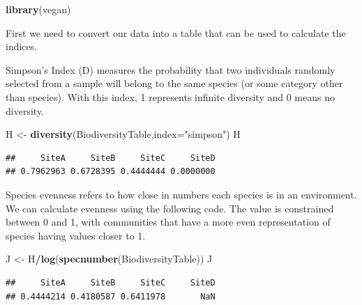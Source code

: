 \documentclass[]{book}
\newenvironment{Shaded}{\begin{snugshade}}{\end{snugshade}}
\newcommand{\DataTypeTok}[1]{\textcolor[rgb]{0.13,0.29,0.53}{#1}}
\newcommand{\KeywordTok}[1]{\textcolor[rgb]{0.13,0.29,0.53}{\textbf{#1}}}
\newcommand{\NormalTok}[1]{#1}
\newcommand{\OperatorTok}[1]{\textcolor[rgb]{0.81,0.36,0.00}{\textbf{#1}}}
\newcommand{\StringTok}[1]{\textcolor[rgb]{0.31,0.60,0.02}{#1}}
\begin{document}
\begin{Shaded}
\begin{Highlighting}[]
\KeywordTok{library}\NormalTok{(vegan)}
\end{Highlighting}
\end{Shaded}

First we need to convert our data into a table that can be used to calculate the indices.

\begin{Shaded}
\end{Shaded}

Simpson's Index (D) measures the probability that two individuals randomly selected from a sample will belong to the same species (or some category other than species). With this index, 1 represents infinite diversity and 0 means no diversity.

\begin{Shaded}
\begin{Highlighting}[]
\NormalTok{H <-}\StringTok{ }\KeywordTok{diversity}\NormalTok{(BiodiversityTable,}\DataTypeTok{index=}\StringTok{"simpson"}\NormalTok{)}
\NormalTok{H}
\end{Highlighting}
\end{Shaded}

\begin{verbatim}
##     SiteA     SiteB     SiteC     SiteD 
## 0.7962963 0.6728395 0.4444444 0.0000000
\end{verbatim}

Species evenness refers to how close in numbers each species is in an environment. We can calculate evenness using the following code. The value is constrained between 0 and 1, with communities that have a more even representation of species having values closer to 1.

\begin{Shaded}
\begin{Highlighting}[]
\NormalTok{J <-}\StringTok{ }\NormalTok{H}\OperatorTok{/}\KeywordTok{log}\NormalTok{(}\KeywordTok{specnumber}\NormalTok{(BiodiversityTable))}
\NormalTok{J}
\end{Highlighting}
\end{Shaded}

\begin{verbatim}
##     SiteA     SiteB     SiteC     SiteD 
## 0.4444214 0.4180587 0.6411978       NaN
\end{verbatim}
\end{document}
